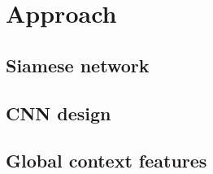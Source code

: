 \section{Approach}

\subsection{Siamese network}

\subsection{CNN design}

\subsection{Global context features}

